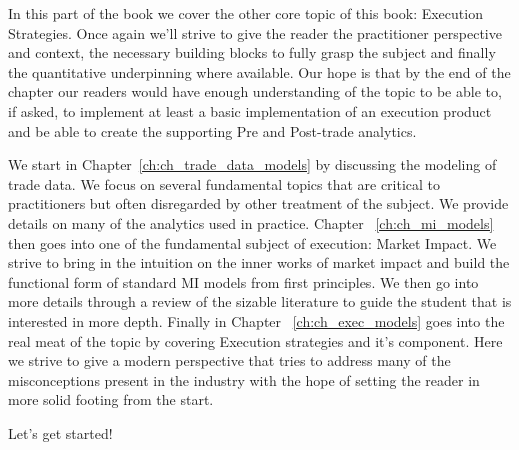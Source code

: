 
In this part of the book we cover the other core topic of this book: Execution Strategies. Once again we'll strive to give the reader the practitioner perspective and context, the necessary building blocks to fully grasp the subject and finally the quantitative underpinning where available.
Our hope is that by the end of the chapter our readers would have enough understanding of the topic to be able to, if asked, to implement at least a basic implementation of an execution product and be able to create the supporting Pre and Post-trade analytics.

We start in Chapter~\ref{ch:ch_trade_data_models} by discussing the modeling of trade data. We focus on several fundamental topics that are critical to practitioners but often disregarded by other treatment of the subject. We provide details on many of the analytics used in practice.
Chapter ~\ref{ch:ch_mi_models} then goes into one of the fundamental subject of execution: Market Impact. We strive to bring in the intuition on the inner works of market impact and build the functional form of standard MI models from first principles. We then go into more details through a review of the sizable literature to guide the student that is interested in more depth.
Finally in Chapter ~\ref{ch:ch_exec_models} goes into the real meat of the topic by covering Execution strategies and it's component. Here we strive to give a modern perspective that tries to address many of the misconceptions present in the industry with the hope of setting the reader in more solid footing from the start.

Let's get started!
